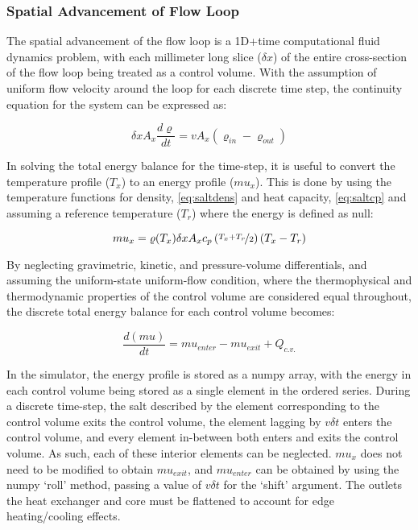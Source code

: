 \subsubsection{Spatial Advancement of Flow Loop}
The spatial advancement of the flow loop is a 1D+time computational fluid dynamics problem, with each millimeter long slice ($\delta x$) of the entire cross-section of the flow loop being treated as a control volume. With the assumption of uniform flow velocity around the loop for each discrete time step, the continuity equation for the system can be expressed as:

\begin{equation}
    \delta x A_x \frac{d\varrho}{dt} = v A_x(\varrho_{in}-\varrho_{out})
\end{equation}

In solving the total energy balance for the time-step, it is useful to convert the temperature profile ($T_x$) to an energy profile ($mu_x$). This is done by using the temperature functions for density, \ref{eq:saltdens}  and heat capacity, \ref{eq:saltcp} and assuming a reference temperature ($T_r$) where the energy is defined as null:

\begin{equation}\label{eq:T2mu}
    mu_x = \varrho(T_x)\delta x A_x
             c_p\left(\nicefrac{T_x+T_r}{2}\right)(T_x-T_r) 
\end{equation}

By neglecting gravimetric, kinetic, and pressure-volume differentials, and assuming the uniform-state uniform-flow condition, where the thermophysical and thermodynamic properties of the control volume are considered equal throughout, the discrete total energy balance for each control volume becomes:

\begin{equation}
    \frac{d(mu)}{dt} = mu_{enter} - mu_{exit} + Q_{c.v.}
\end{equation}

In the simulator, the energy profile is stored as a numpy array, with the energy in each control volume being stored as a single element in the ordered series. During a discrete time-step, the salt described by the element corresponding to the control volume exits the control volume, the element lagging by $v\delta t$ enters the control volume, and every element in-between both enters and exits the control volume. As such, each of these interior elements can be neglected. $mu_x$ does not need to be modified to obtain $mu_{exit}$, and $mu_{enter}$ can be obtained by using the numpy `roll' method, passing a value of $v\delta t$ for the `shift' argument. The outlets the heat exchanger and core must be flattened to account for edge heating/cooling effects. 

